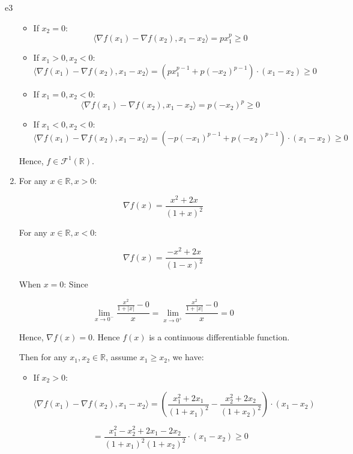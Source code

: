 \documentclass{article}
\begin{document}
\begin{PROOF}{e3}
\begin{enumerate}
\begin{itemize}
		\item If \(x_{2}=0\):
		\[
		\langle\nabla f\left(x_{1}\right)-\nabla f\left(x_{2}\right),x_{1}-x_{2} \rangle=px_{1}^{p}\geq 0
		\]
		
		\item If \(x_{1}>0, x_{2}<0\):
		\[
		\langle\nabla f\left(x_{1}\right)-\nabla f\left(x_{2}\right),x_{1}-x_{2} \rangle=\left(px_{1}^{p-1}+p\left(-x_{2}\right)^{p-1}\right)\cdot\left(x_{1}-x_{2}\right)\geq 0
		\]
		
		\item If \(x_{1}=0, x_{2}<0\):
		\[
		\langle\nabla f\left(x_{1}\right)-\nabla f\left(x_{2}\right),x_{1}-x_{2} \rangle=p\left(-x_{2}\right)^{p}\geq 0
		\]
		
		\item If \(x_{1}<0, x_{2}<0\):
		\[
		\langle\nabla f\left(x_{1}\right)-\nabla f\left(x_{2}\right),x_{1}-x_{2} \rangle=\left(-p\left(-x_{1}\right)^{p-1}+p\left(-x_{2}\right)^{p-1}\right)\cdot\left(x_{1}-x_{2}\right)\geq 0
		\]
	\end{itemize}

	Hence, \(f\in\mathcal{F}^{1}(\mathbb{R})\).
	\item For any \(x\in\mathbb{R}, x>0\):

	\[
	\nabla f\left(x\right) = \frac{x^{2} + 2x}{\left(1 + x\right)^{2}}
	\]
	
	For any \(x\in\mathbb{R}, x<0\):
	
	\[
	\nabla f\left(x\right) = \frac{-x^{2} + 2x}{\left(1 - x\right)^{2}}
	\]
	
	When \(x = 0\): Since
	
	\[
	\lim_{x \to 0^{-}} \frac{\frac{x^{2}}{1 + |x|} - 0}{x} = \lim_{x \to 0^{+}} \frac{\frac{x^{2}}{1 + |x|} - 0}{x} = 0
	\]
	
	Hence, $\nabla f(x) = 0$. Hence $f(x)$ is a continuous differentiable function.
	
	Then for any \(x_{1}, x_{2} \in \mathbb{R}\), assume \(x_{1} \geq x_{2}\), we have:
	\begin{itemize}
		\item If \(x_{2} > 0\):
	
		\[
		\langle \nabla f\left(x_{1}\right) - \nabla f\left(x_{2}\right), x_{1} - x_{2} \rangle = \left(\frac{x_{1}^{2} + 2x_{1}}{\left(1 + x_{1}\right)^{2}} - \frac{x_{2}^{2} + 2x_{2}}{\left(1 + x_{2}\right)^{2}}\right) \cdot \left(x_{1} - x_{2}\right)
		\]
		
		\[
		= \frac{x_{1}^{2} - x_{2}^{2} + 2x_{1} - 2x_{2}}{\left(1 + x_{1}\right)^{2} \left(1 + x_{2}\right)^{2}} \cdot \left(x_{1} - x_{2}\right) \geq 0
		\]
	

\end{itemize}
\end{enumerate}
\end{PROOF}
\end{document}
